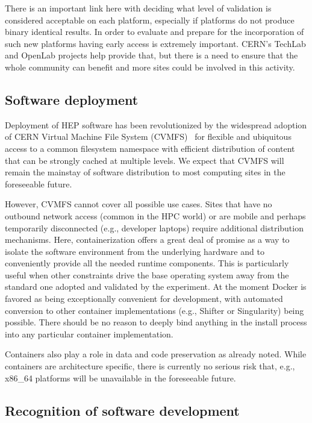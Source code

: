 \documentclass[12pt,a4paper]{article}
\begin{document}
There is an important link here with deciding what level of validation
is considered acceptable on each platform, especially if platforms do
not produce binary identical results. In order to evaluate and prepare
for the incorporation of such new platforms having early access is
extremely important. CERN's TechLab and OpenLab projects help provide
that, but there is a need to ensure that the whole community can benefit
and more sites could be involved in this activity.

\hypertarget{software-deployment}{%
\subsection{Software deployment}\label{software-deployment}}

Deployment of HEP software has been revolutionized by the widespread
adoption of CERN Virtual Machine File System (CVMFS)~\cite{7310920}
for flexible and ubiquitous access to a common
filesystem namespace with efficient distribution of content that can be
strongly cached at multiple levels. We expect that CVMFS will remain the
mainstay of software distribution to most computing sites in the
foreseeable future.

However, CVMFS cannot cover all possible use cases. Sites that have no
outbound network access (common in the HPC world) or are mobile and
perhaps temporarily disconnected (e.g., developer laptops) require
additional distribution mechanisms. Here, containerization offers a
great deal of promise as a way to isolate the software environment from
the underlying hardware and to conveniently provide all the needed
runtime components. This is particularly useful when other constraints
drive the base operating system away from the standard one adopted and
validated by the experiment. At the moment Docker is favored as being
exceptionally convenient for development, with automated conversion to
other container implementations (e.g., Shifter or Singularity) being
possible. There should be no reason to deeply bind anything in the
install process into any particular container implementation.

Containers also play a role in data and code preservation as already
noted. While containers are architecture specific, there is currently no
serious risk that, e.g., x86\_64 platforms will be unavailable in the
foreseeable future.

\hypertarget{recognition-of-software-development}{%
\subsection{Recognition of software
development}\label{recognition-of-software-development}}
\end{document}
